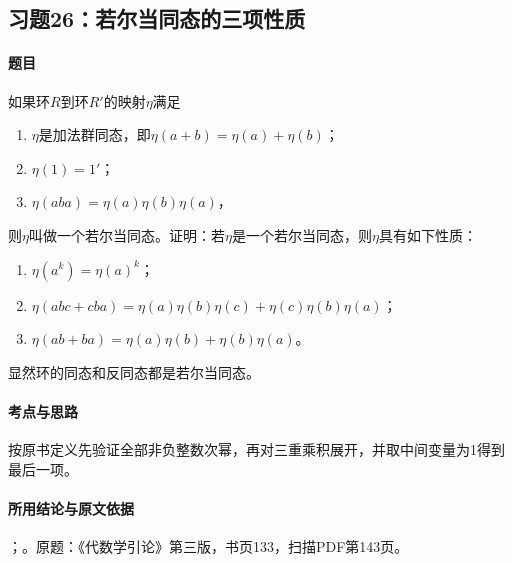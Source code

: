 \subsection{习题26：若尔当同态的三项性质}

\label{ex:3:26}

\paragraph{题目}

如果环$R$到环$R'$的映射$\eta$满足
\begin{enumerate}[label=(\roman*)]
\item $\eta$是加法群同态，即$\eta(a+b)=\eta(a)+\eta(b)$；
\item $\eta(1)=1'$；
\item $\eta(aba)=\eta(a)\eta(b)\eta(a)$，
\end{enumerate}
则$\eta$叫做一个若尔当同态。证明：若$\eta$是一个若尔当同态，则$\eta$具有如下性质：
\begin{enumerate}[label=(\roman*)]
\item $\eta(a^k)=\eta(a)^k$；
\item $\eta(abc+cba)=\eta(a)\eta(b)\eta(c)+\eta(c)\eta(b)\eta(a)$；
\item $\eta(ab+ba)=\eta(a)\eta(b)+\eta(b)\eta(a)$。
\end{enumerate}
显然环的同态和反同态都是若尔当同态。

\paragraph{考点与思路}

按原书定义先验证全部非负整数次幂，再对三重乘积展开，并取中间变量为1得到最后一项。

\paragraph{所用结论与原文依据}

；。原题：《代数学引论》第三版，书页133，扫描PDF第143页。


